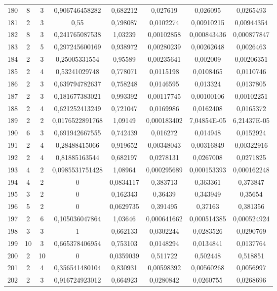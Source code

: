 \begin{longtable}{|c|c|c|c|c|c|c|c|}
180 & 8 & 3 & 0,906746458282 & 0,682212 & 0,027619 & 0,026095 & 0,0265493  \\
181 & 2 & 3 & 0,55 & 0,798087 & 0,0102274 & 0,00910215 & 0,00944354  \\
182 & 8 & 3 & 0,241765087538 & 1,03239 & 0,00102858 & 0,000843436 & 0,000877847  \\
183 & 2 & 5 & 0,297245600169 & 0,938972 & 0,00280239 & 0,00262648 & 0,0026463  \\
184 & 2 & 3 & 0,25005331554 & 0,95589 & 0,00235641 & 0,002009 & 0,00206351  \\
185 & 2 & 4 & 0,53241029748 & 0,778071 & 0,0115198 & 0,0108465 & 0,0110746  \\
186 & 2 & 3 & 0,639794782637 & 0,758248 & 0,0146595 & 0,013324 & 0,0137805  \\
187 & 2 & 3 & 0,181677383021 & 0,993392 & 0,00117745 & 0,00100106 & 0,00102251  \\
188 & 2 & 4 & 0,621252413249 & 0,721047 & 0,0169986 & 0,0162408 & 0,0165372  \\
189 & 2 & 2 & 0,0176522891768 & 1,09149 & 0,000183402 & 7,04854E-05 & 6,21437E-05  \\
190 & 6 & 3 & 0,691942667555 & 0,742439 & 0,016272 & 0,014948 & 0,0152924  \\
191 & 2 & 4 & 0,28488415066 & 0,919652 & 0,00348043 & 0,00316849 & 0,00322916  \\
192 & 2 & 4 & 0,81885163544 & 0,682197 & 0,0278131 & 0,0267008 & 0,0271825  \\
193 & 4 & 2 & 0,0985531751428 & 1,08964 & 0,000295689 & 0,000153393 & 0,000162248  \\
194 & 4 & 2 & 0 & 0,0834117 & 0,383713 & 0,363361 & 0,373847  \\
195 & 3 & 2 & 0 & 0,162343 & 0,36439 & 0,343949 & 0,35654  \\
196 & 5 & 2 & 0 & 0,0629735 & 0,391495 & 0,37163 & 0,381356  \\
197 & 2 & 6 & 0,105036047864 & 1,03646 & 0,000641662 & 0,000514385 & 0,000524924  \\
198 & 3 & 3 & 1 & 0,662133 & 0,0302244 & 0,0283526 & 0,0290769  \\
199 & 10 & 3 & 0,665378406954 & 0,753103 & 0,0148294 & 0,0134841 & 0,0137764  \\
200 & 2 & 10 & 0 & 0,0359039 & 0,511722 & 0,502448 & 0,518851  \\
201 & 2 & 4 & 0,356541480104 & 0,830931 & 0,00598392 & 0,00560268 & 0,0056997  \\
202 & 2 & 3 & 0,916724923012 & 0,664923 & 0,0280842 & 0,0260755 & 0,0268696  \\

\end{longtable}
